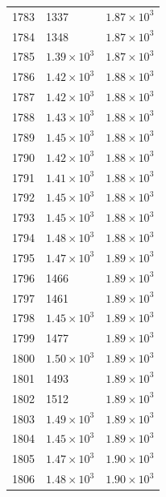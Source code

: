 \begin{table}[H]
\begin{tabular}{lll}
1783 & 1337 & $\displaystyle 1.87 \times 10^{3}$ \\
1784 & 1348 & $\displaystyle 1.87 \times 10^{3}$ \\
1785 & $\displaystyle 1.39 \times 10^{3}$ & $\displaystyle 1.87 \times 10^{3}$ \\
1786 & $\displaystyle 1.42 \times 10^{3}$ & $\displaystyle 1.88 \times 10^{3}$ \\
1787 & $\displaystyle 1.42 \times 10^{3}$ & $\displaystyle 1.88 \times 10^{3}$ \\
1788 & $\displaystyle 1.43 \times 10^{3}$ & $\displaystyle 1.88 \times 10^{3}$ \\
1789 & $\displaystyle 1.45 \times 10^{3}$ & $\displaystyle 1.88 \times 10^{3}$ \\
1790 & $\displaystyle 1.42 \times 10^{3}$ & $\displaystyle 1.88 \times 10^{3}$ \\
1791 & $\displaystyle 1.41 \times 10^{3}$ & $\displaystyle 1.88 \times 10^{3}$ \\
1792 & $\displaystyle 1.45 \times 10^{3}$ & $\displaystyle 1.88 \times 10^{3}$ \\
1793 & $\displaystyle 1.45 \times 10^{3}$ & $\displaystyle 1.88 \times 10^{3}$ \\
1794 & $\displaystyle 1.48 \times 10^{3}$ & $\displaystyle 1.88 \times 10^{3}$ \\
1795 & $\displaystyle 1.47 \times 10^{3}$ & $\displaystyle 1.89 \times 10^{3}$ \\
1796 & 1466 & $\displaystyle 1.89 \times 10^{3}$ \\
1797 & 1461 & $\displaystyle 1.89 \times 10^{3}$ \\
1798 & $\displaystyle 1.45 \times 10^{3}$ & $\displaystyle 1.89 \times 10^{3}$ \\
1799 & 1477 & $\displaystyle 1.89 \times 10^{3}$ \\
1800 & $\displaystyle 1.50 \times 10^{3}$ & $\displaystyle 1.89 \times 10^{3}$ \\
1801 & 1493 & $\displaystyle 1.89 \times 10^{3}$ \\
1802 & 1512 & $\displaystyle 1.89 \times 10^{3}$ \\
1803 & $\displaystyle 1.49 \times 10^{3}$ & $\displaystyle 1.89 \times 10^{3}$ \\
1804 & $\displaystyle 1.45 \times 10^{3}$ & $\displaystyle 1.89 \times 10^{3}$ \\
1805 & $\displaystyle 1.47 \times 10^{3}$ & $\displaystyle 1.90 \times 10^{3}$ \\
1806 & $\displaystyle 1.48 \times 10^{3}$ & $\displaystyle 1.90 \times 10^{3}$ \\

\end{tabular}
\end{table}
